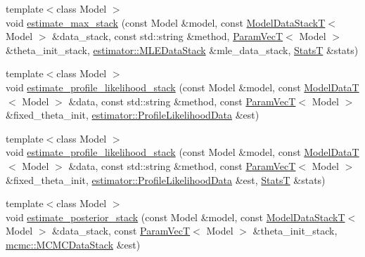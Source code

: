\begin{DoxyCompactItemize}
\item 
{\footnotesize template$<$class Model $>$ }\\void \hyperlink{namespacemappel_1_1methods_1_1openmp_a8e3af28b0599091dbcc1ee882ea36498}{estimate\+\_\+max\+\_\+stack} (const Model \&model, const \hyperlink{namespacemappel_aaeb6665bc57476dd93c2df6ad8bc4768}{Model\+Data\+StackT}$<$ Model $>$ \&data\+\_\+stack, const std\+::string \&method, \hyperlink{namespacemappel_a0f86d3153e4e27b095012f140eea58de}{Param\+VecT}$<$ Model $>$ \&theta\+\_\+init\+\_\+stack, \hyperlink{namespacemappel_1_1estimator_structmappel_1_1estimator_1_1MLEDataStack}{estimator\+::\+M\+L\+E\+Data\+Stack} \&mle\+\_\+data\+\_\+stack, \hyperlink{namespacemappel_a04ab395b0cf82c4ce68a36b2212649a5}{StatsT} \&stats)
\item 
{\footnotesize template$<$class Model $>$ }\\void \hyperlink{namespacemappel_1_1methods_1_1openmp_adaca1fbf3ed4990eee89a7721cfa5666}{estimate\+\_\+profile\+\_\+likelihood\+\_\+stack} (const Model \&model, const \hyperlink{namespacemappel_a97f050df953605381ae9c901c3b125f1}{Model\+DataT}$<$ Model $>$ \&data, const std\+::string \&method, const \hyperlink{namespacemappel_a0f86d3153e4e27b095012f140eea58de}{Param\+VecT}$<$ Model $>$ \&fixed\+\_\+theta\+\_\+init, \hyperlink{namespacemappel_1_1estimator_structmappel_1_1estimator_1_1ProfileLikelihoodData}{estimator\+::\+Profile\+Likelihood\+Data} \&est)
\item 
{\footnotesize template$<$class Model $>$ }\\void \hyperlink{namespacemappel_1_1methods_1_1openmp_a5e8898ef99b03faec55c9165b96ecb30}{estimate\+\_\+profile\+\_\+likelihood\+\_\+stack} (const Model \&model, const \hyperlink{namespacemappel_a97f050df953605381ae9c901c3b125f1}{Model\+DataT}$<$ Model $>$ \&data, const std\+::string \&method, const \hyperlink{namespacemappel_a0f86d3153e4e27b095012f140eea58de}{Param\+VecT}$<$ Model $>$ \&fixed\+\_\+theta\+\_\+init, \hyperlink{namespacemappel_1_1estimator_structmappel_1_1estimator_1_1ProfileLikelihoodData}{estimator\+::\+Profile\+Likelihood\+Data} \&est, \hyperlink{namespacemappel_a04ab395b0cf82c4ce68a36b2212649a5}{StatsT} \&stats)
\item 
{\footnotesize template$<$class Model $>$ }\\void \hyperlink{namespacemappel_1_1methods_1_1openmp_ae2fe47dafd5e1d2ca73fbc24ba34c4ff}{estimate\+\_\+posterior\+\_\+stack} (const Model \&model, const \hyperlink{namespacemappel_aaeb6665bc57476dd93c2df6ad8bc4768}{Model\+Data\+StackT}$<$ Model $>$ \&data\+\_\+stack, const \hyperlink{namespacemappel_a0f86d3153e4e27b095012f140eea58de}{Param\+VecT}$<$ Model $>$ \&theta\+\_\+init\+\_\+stack, \hyperlink{structmappel_1_1mcmc_1_1MCMCDataStack}{mcmc\+::\+M\+C\+M\+C\+Data\+Stack} \&est)

\end{DoxyCompactItemize}

